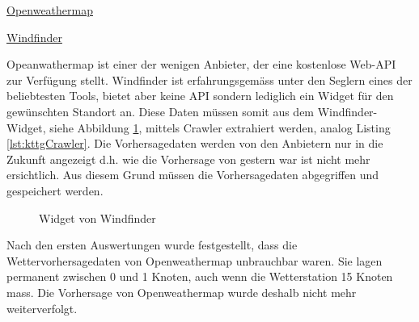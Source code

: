 \begin{itemize*}
\item \href{https://openweathermap.org/city/2661731}{Openweathermap}
\item \href{https://www.windfinder.com/forecast/arbon}{Windfinder}
\end{itemize*}

\noindent
Opeanwathermap ist einer der wenigen Anbieter, der eine kostenlose Web-API zur Verfügung stellt. Windfinder ist erfahrungsgemäss unter den Seglern eines der beliebtesten Tools, bietet aber keine API sondern lediglich ein Widget für den gewünschten Standort an. Diese Daten müssen somit aus dem Windfinder-Widget, siehe Abbildung \ref{img:windfinder}, mittels Crawler extrahiert werden, analog Listing \ref{lst:kttgCrawler}. Die Vorhersagedaten werden von den Anbietern nur in die Zukunft angezeigt d.h. wie die Vorhersage von gestern war ist nicht mehr ersichtlich. Aus diesem Grund müssen die Vorhersagedaten abgegriffen und gespeichert werden.


\begin{figure}[h!]
	\centering
	\caption{Widget von Windfinder}
	\label{img:windfinder}
\end{figure}

Nach den ersten Auswertungen wurde festgestellt, dass die Wettervorhersagedaten von Openweathermap unbrauchbar waren. Sie lagen permanent zwischen 0 und 1 Knoten, auch wenn die Wetterstation 15 Knoten mass. Die Vorhersage von Openweathermap wurde deshalb nicht mehr weiterverfolgt.





